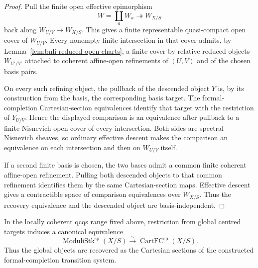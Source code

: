 \begin{proof}
Pull the finite open effective epimorphism
\[
    W=\coprod_aW_a\twoheadrightarrow W_{X/S}
\]
back along $W_{U/V}\to W_{X/S}$.  This gives a finite representable
quasi-compact open cover of $W_{U/V}$.  Every nonempty finite intersection in
that cover admits, by Lemma~\ref{lem:bnli-reduced-open-charts}, a finite cover
by relative reduced objects $W_{U'/V'}$ attached to coherent affine-open
refinements of $(U,V)$ and of the chosen basis pairs.

On every such refining object, the pullback of the descended object $Y$ is,
by its construction from the basis, the corresponding basis target.  The
formal-completion Cartesian-section equivalences identify that target with
the restriction of $Y_{U/V}$.  Hence the displayed comparison is an
equivalence after pullback to a finite Nisnevich open cover of every
intersection.  Both sides are spectral Nisnevich sheaves, so ordinary
effective descent makes the comparison an equivalence on each intersection
and then on $W_{U/V}$ itself.

If a second finite basis is chosen, the two bases admit a common finite
coherent affine-open refinement.  Pulling both descended objects to that
common refinement identifies them by the same Cartesian-section maps.
Effective descent gives a contractible space of comparison equivalences over
$W_{X/S}$.  Thus the recovery equivalence and the descended object are
basis-independent.
\end{proof}

\begin{proposition}
\label{prop:bnli-formal-completion-descent}
In the locally coherent qcqs range fixed above, restriction from global
centred targets induces a canonical equivalence
\[
\boxed{
    \operatorname{ModuliStk}^{\mathrm{sp}}(X/S)
    \xrightarrow{\sim}
    \operatorname{CartFC}^{\mathrm{sp}}(X/S).}
\]
Thus the global objects are recovered as the Cartesian sections of the
constructed formal-completion transition system.
\end{proposition}

